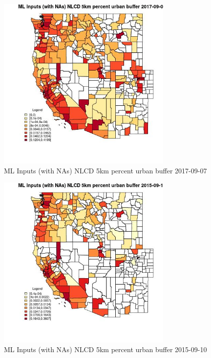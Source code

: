 \clearpage 

\begin{figure} 
\centering  
\includegraphics[width=0.77\textwidth]{Code_Outputs/Report_ML_input_PM25_Step4_part_e_de_duplicated_aves_compiled_2019-05-21wNAs_CountyNLCD_5km_percent_urban_bufferMean2017-09-07.jpg} 
\caption{\label{fig:Report_ML_input_PM25_Step4_part_e_de_duplicated_aves_compiled_2019-05-21wNAsCountyNLCD_5km_percent_urban_bufferMean2017-09-07}ML Inputs (with NAs) NLCD 5km percent urban buffer 2017-09-07} 
\end{figure} 
 

\begin{figure} 
\centering  
\includegraphics[width=0.77\textwidth]{Code_Outputs/Report_ML_input_PM25_Step4_part_e_de_duplicated_aves_compiled_2019-05-21wNAs_CountyNLCD_5km_percent_urban_bufferMean2015-09-10.jpg} 
\caption{\label{fig:Report_ML_input_PM25_Step4_part_e_de_duplicated_aves_compiled_2019-05-21wNAsCountyNLCD_5km_percent_urban_bufferMean2015-09-10}ML Inputs (with NAs) NLCD 5km percent urban buffer 2015-09-10} 
\end{figure} 
 

